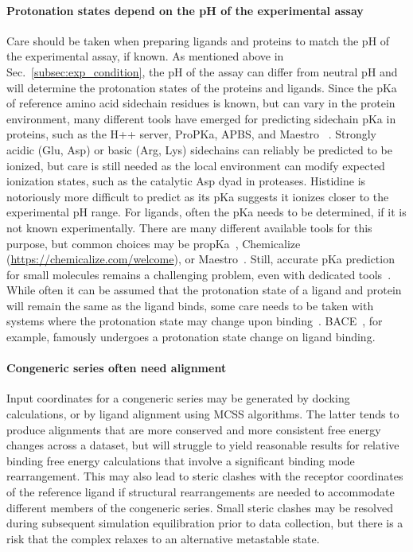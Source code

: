 \documentclass[9pt,bestpractices]{livecoms}
\begin{document}
\paragraph{Protonation states depend on the pH of the experimental assay}
Care should be taken when preparing ligands and proteins to match the pH of the experimental assay, if known. As mentioned above in Sec.~\ref{subsec:exp_condition}, the pH of the assay can differ from neutral pH and will determine the protonation states of the proteins and ligands. Since the pKa of reference amino acid sidechain residues is known, but can vary in the protein environment, many different tools have emerged for predicting sidechain pKa in proteins, such as the H++ server, ProPKa, APBS, and Maestro ~\cite{anandakrishnan2012automating, sondergaard2011improved, jurrus2018improvements, 2020schrodinger}. Strongly acidic (Glu, Asp) or basic (Arg, Lys) sidechains can reliably be predicted to be ionized, but care is still needed as the local environment can modify expected ionization states, such as  the catalytic Asp dyad in proteases. Histidine is notoriously more difficult to predict as its pKa suggests it ionizes closer to the experimental pH range. For ligands, often the pKa needs to be determined, if it is not known experimentally. There are many different available tools for this purpose, but common choices may be propKa~\cite{olsson2011propka3,sondergaard2011improved}, Chemicalize (\url{https://chemicalize.com/welcome}), or Maestro~\cite{2020schrodinger}. Still, accurate pKa prediction for small molecules remains a challenging problem, even with dedicated tools~\cite{isik2018pka}. While often it can be assumed that the protonation state of a ligand and protein will remain the same as the ligand binds, some care needs to be taken with systems where the protonation state may change upon binding~\cite{onufriev2013protonation}. BACE~\cite{kim2015conformational}, for example, famously undergoes a protonation state change on ligand binding.


\paragraph{Congeneric series often need alignment}
Input coordinates for a congeneric series may be generated by docking calculations, or by ligand alignment using MCSS algorithms. The latter tends to produce alignments that are more conserved and more consistent free energy changes across a dataset, but will struggle to yield reasonable results for relative binding free energy calculations that involve a significant binding mode rearrangement. This may also lead to steric clashes with the receptor coordinates of the reference ligand if structural rearrangements are needed to accommodate different members of the congeneric series. Small steric clashes may be resolved during subsequent simulation equilibration prior to data collection, but there is a risk that the complex relaxes to an alternative metastable state. 
\end{document}
